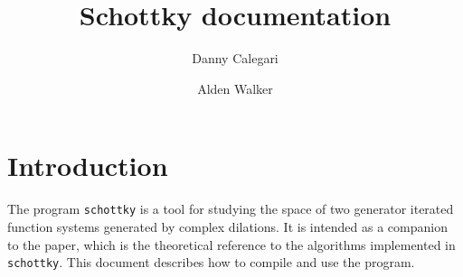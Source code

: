 \documentclass{amsart}
\begin{document}
\sloppy

\newtheorem{theorem}{Theorem}[subsection]
\newtheorem{lemma}[theorem]{Lemma}
\newtheorem{corollary}[theorem]{Corollary}
\newtheorem{conjecture}[theorem]{Conjecture}
\newtheorem{proposition}[theorem]{Proposition}
\newtheorem{question}[theorem]{Question}
\newtheorem{problem}[theorem]{Problem}
\newtheorem*{main_thm}{Random Surface Subgroup Theorem~\ref{thm:random_amalgam_surface}}
\newtheorem*{claim}{Claim}
\newtheorem*{criterion}{Criterion}
\theoremstyle{definition}
\newtheorem{definition}[theorem]{Definition}
\newtheorem{construction}[theorem]{Construction}
\newtheorem{notation}[theorem]{Notation}
\newtheorem{convention}[theorem]{Convention}
\newtheorem*{warning}{Warning}

\theoremstyle{remark}
\newtheorem{remark}[theorem]{Remark}
\newtheorem{example}[theorem]{Example}
\newtheorem*{case}{Case}

\def\Z{{\mathbb Z}}
\def\R{{\mathbb R}}
\def\H{{\mathbb H}}
\def\E{{\mathcal E}}
\def\rot{\textnormal{rot}}
\def\scl{\textnormal{scl}}

\def\tra{\textnormal{tr}}
\def\length{\textnormal{length}}

\newcommand{\marginal}[1]{\marginpar{\tiny #1}}



\title{Schottky documentation}
\author{Danny Calegari}
\address{Department of Mathematics \\ University of Chicago \\
Chicago, Illinois, 60637}
\author{Alden Walker}
\address{Department of Mathematics \\ University of Chicago \\
Chicago, Illinois, 60637}


\maketitle

\section{Introduction}

The program \texttt{schottky}\cite{program} is a tool for studying the 
space of two generator iterated function systems generated by complex dilations. 
It is intended as a companion to the paper\cite{paper}, which 
is the theoretical reference to the algorithms implemented in \texttt{schottky}.
This document describes how to compile and use the program.
\end{document}
